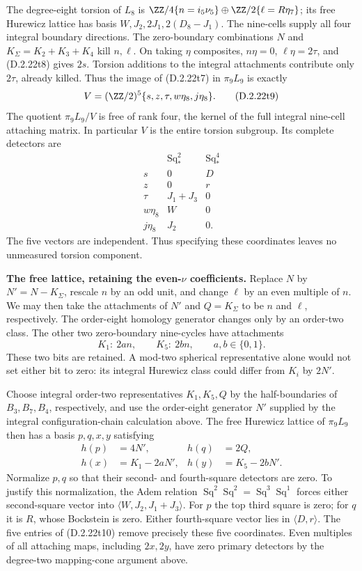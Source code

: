 The degree-eight torsion of $L_8$ is
$\ZZ/4\{n=i_5\nu_5\}\oplus\ZZ/2\{\ell=R\eta_7\}$;
its free Hurewicz lattice has basis
$W,J_2,2J_1,2(D_8-J_1)$.
The nine-cells supply all four integral boundary directions.
The zero-boundary combinations $N$ and
$K_\Sigma=K_2+K_3+K_4$ kill $n,\ell$.
On taking $\eta$ composites, $n\eta=0$,
$\ell\eta=2\tau$, and \textup{(D.2.22t8)} gives $2s$.
Torsion additions to the integral attachments contribute only
$2\tau$, already killed.  Thus the image of
\textup{(D.2.22t7)} in $\pi_9L_9$ is exactly
\[
 V=(\ZZ/2)^5\{s,z,\tau,w\eta_8,j\eta_8\}.
 \tag{D.2.22t9}
\]
The quotient $\pi_9L_9/V$ is free of rank four, the kernel
of the full integral nine-cell attaching matrix.  In particular
$V$ is the entire torsion subgroup.  Its complete detectors are
\[
\begin{array}{c|c|c}
 &\operatorname{Sq}_*^2&\operatorname{Sq}_*^4\\ \hline
 s&0&D\\
 z&0&r\\
 \tau&J_1+J_3&0\\
 w\eta_8&W&0\\
 j\eta_8&J_2&0.
\end{array}
 \tag{D.2.22t10}
\]
The five vectors are independent.  Thus specifying these
coordinates leaves no unmeasured torsion component.

\medskip\noindent
\textbf{The free lattice, retaining the even-$\nu$ coefficients.}
Replace $N$ by $N'=N-K_\Sigma$, rescale $n$ by an odd
unit, and change $\ell$ by an even multiple of $n$.
We may then take the attachments of $N'$ and
$Q=K_\Sigma$ to be $n$ and $\ell$, respectively.
The order-eight homology generator changes only by an
order-two class.  The other two zero-boundary nine-cycles
have attachments
\[
 K_1:\ 2a n,
       \qquad K_5:\ 2b n,
       \qquad a,b\in\{0,1\}.
 \tag{D.2.22t11}
\]
These two bits are retained.  A mod-two spherical representative
alone would not set either bit to zero: its integral Hurewicz
class could differ from $K_i$ by $2N'$.

Choose integral order-two representatives $K_1,K_5,Q$ by
the half-boundaries of $B_3,B_7,B_4$, respectively, and use
the order-eight generator $N'$ supplied by the integral
configuration-chain calculation above.
The free Hurewicz lattice of $\pi_9L_9$ then has a basis
$p,q,x,y$ satisfying
\[
 \begin{aligned}
 h(p)&=4N',& h(q)&=2Q,\\
 h(x)&=K_1-2aN',&h(y)&=K_5-2bN'.
 \end{aligned}
 \tag{D.2.22t12}
\]
Normalize $p,q$ so that their second- and fourth-square
detectors are zero.  To justify this normalization, the Adem
relation $\operatorname{Sq}^2\operatorname{Sq}^2
=\operatorname{Sq}^3\operatorname{Sq}^1$ forces either
second-square vector into
$\langle W,J_2,J_1+J_3\rangle$.
For $p$ the top third square is zero; for $q$ it is $R$,
whose Bockstein is zero.  Either fourth-square vector lies
in $\langle D,r\rangle$.
The five entries of \textup{(D.2.22t10)} remove precisely
these five coordinates.  Even multiples of all attaching maps,
including $2x,2y$, have zero primary detectors by the
degree-two mapping-cone argument above.

